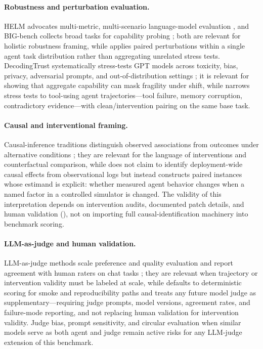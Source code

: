 \paragraph{Robustness and perturbation evaluation.}
HELM advocates multi-metric, multi-scenario language-model evaluation \citep{liang2023holisticevaluationlanguagemodels}, and BIG-bench collects broad tasks for capability probing \citep{srivastava2023imitationgamequantifyingextrapolating}; both are relevant for holistic robustness framing, while \CAB{} applies paired perturbations within a single agent task distribution rather than aggregating unrelated stress tests.
DecodingTrust systematically stress-tests GPT models across toxicity, bias, privacy, adversarial prompts, and out-of-distribution settings \citep{wang2023decodingtrustcomprehensiveassessment}; it is relevant for showing that aggregate capability can mask fragility under shift, while \CAB{} narrows stress tests to tool-using agent trajectories---tool failure, memory corruption, contradictory evidence---with clean/intervention pairing on the same base task.

\paragraph{Causal and interventional framing.}
Causal-inference traditions distinguish observed associations from outcomes under alternative conditions \citep{holland1986statisticscausalinference,pearl2009causality}; they are relevant for the language of interventions and counterfactual comparison, while \CAB{} does not claim to identify deployment-wide causal effects from observational logs but instead constructs paired instances whose estimand is explicit: whether measured agent behavior changes when a named factor in a controlled simulator is changed.
The validity of this interpretation depends on intervention audits, documented patch details, and human validation (), not on importing full causal-identification machinery into benchmark scoring.

\paragraph{LLM-as-judge and human validation.}
LLM-as-judge methods scale preference and quality evaluation and report agreement with human raters on chat tasks \citep{zheng2023judgingllmasajudgemtbenchchatbot}; they are relevant when trajectory or intervention validity must be labeled at scale, while \CAB{} defaults to deterministic scoring for smoke and reproducibility paths and treats any future model judge as supplementary---requiring judge prompts, model versions, agreement rates, and failure-mode reporting, and not replacing human validation for intervention validity.
Judge bias, prompt sensitivity, and circular evaluation when similar models serve as both agent and judge remain active risks for any LLM-judge extension of this benchmark.

